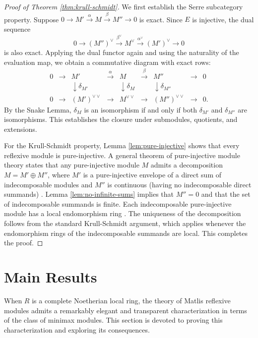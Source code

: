 \documentclass{kms-c}
\theoremstyle{plain}
\theoremstyle{definition}
\theoremstyle{remark}
\begin{document}
\begin{proof}[Proof of Theorem \ref{thm:krull-schmidt}]
We first establish the Serre subcategory property. Suppose \( 0 \to M' \xrightarrow{\alpha} M \xrightarrow{\beta} M'' \to 0 \) is exact. Since \( E \) is injective, the dual sequence
\[
0 \to (M'')^\vee \xrightarrow{\beta^\vee} M^\vee \xrightarrow{\alpha^\vee} (M')^\vee \to 0
\]
is also exact. Applying the dual functor again and using the naturality of the evaluation map, we obtain a commutative diagram with exact rows:
\[
\begin{array}{ccccccccc}
0 & \to & M' & \xrightarrow{\alpha} & M & \xrightarrow{\beta} & M'' & \to & 0 \\
 & & \downarrow{\delta_{M'}} & & \downarrow{\delta_M} & & \downarrow{\delta_{M''}} & & \\
0 & \to & (M')^{\vee\vee} & \to & M^{\vee\vee} & \to & (M'')^{\vee\vee} & \to & 0.
\end{array}
\]
By the Snake Lemma, \( \delta_M \) is an isomorphism if and only if both \( \delta_{M'} \) and \( \delta_{M''} \) are isomorphisms. This establishes the closure under submodules, quotients, and extensions.

For the Krull-Schmidt property, Lemma \ref{lem:pure-injective} shows that every reflexive module is pure-injective. A general theorem of pure-injective module theory states that any pure-injective module \( M \) admits a decomposition \( M = M' \oplus M'' \), where \( M' \) is a pure-injective envelope of a direct sum of indecomposable modules and \( M'' \) is continuous (having no indecomposable direct summands) \cite[Theorem 8.25]{Brodmann1998}. Lemma \ref{lem:no-infinite-sums} implies that \( M'' = 0 \) and that the set of indecomposable summands is finite. Each indecomposable pure-injective module has a local endomorphism ring \cite[Corollary 4.4]{Krause2025}. The uniqueness of the decomposition follows from the standard Krull-Schmidt argument, which applies whenever the endomorphism rings of the indecomposable summands are local. This completes the proof. 
\end{proof}

\section{Main Results}

When \( R \) is a complete Noetherian local ring, the theory of Matlis reflexive modules admits a remarkably elegant and transparent characterization in terms of the class of minimax modules. This section is devoted to proving this characterization and exploring its consequences.
\end{document}
